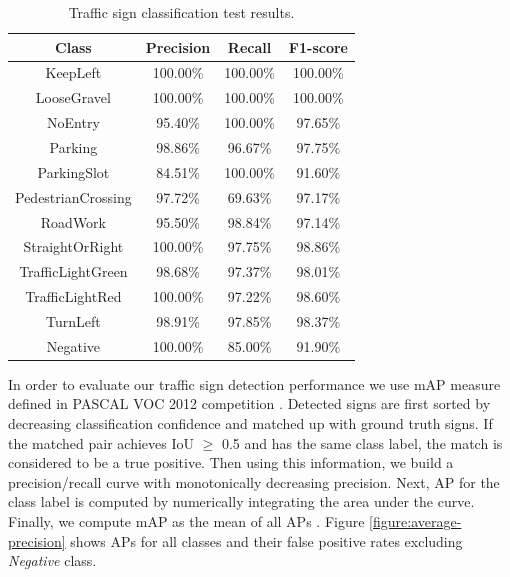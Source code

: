 \begin{table}[h]
  \begin{center}
    \caption[Traffic sign classification test results]{Traffic sign
      classification test results.}
    \label{table:classification-test-results}
    \begin{tabular}{|c|c|c|c|}
      \hline
      \textbf{Class}     & \textbf{Precision} & \textbf{Recall}  & \textbf{F1-score} \\
      \hline
      KeepLeft           & 100.00\%           & 100.00\%         & 100.00\% \\
      LooseGravel        & 100.00\%           & 100.00\%         & 100.00\% \\
      NoEntry            & 95.40\%            & 100.00\%         &  97.65\% \\
      Parking            & 98.86\%            & 96.67\%          &  97.75\% \\
      ParkingSlot        & 84.51\%            & 100.00\%         &  91.60\% \\
      PedestrianCrossing & 97.72\%            & 69.63\%          &  97.17\% \\
      RoadWork           & 95.50\%            & 98.84\%          &  97.14\% \\
      StraightOrRight    & 100.00\%           & 97.75\%          &  98.86\% \\
      TrafficLightGreen  & 98.68\%            & 97.37\%          &  98.01\% \\
      TrafficLightRed    & 100.00\%           & 97.22\%          &  98.60\% \\
      TurnLeft           & 98.91\%            & 97.85\%          &  98.37\% \\
      Negative           & 100.00\%           & 85.00\%          &  91.90\% \\
      \hline
    \end{tabular}
  \end{center}
\end{table}

In order to evaluate our traffic sign detection performance we use mAP measure
defined in PASCAL VOC 2012 competition \cite{Everingham2010ThePV}. Detected
signs are first sorted by decreasing classification confidence and matched up
with ground truth signs. If the matched pair achieves IoU $\ge$ 0.5 and has the
same class label, the match is considered to be a true positive. Then using
this information, we build a precision/recall curve with monotonically
decreasing precision. Next, AP for the class label is computed by numerically
integrating the area under the curve. Finally, we compute mAP as the mean of
all APs \cite{Cartucho2019MAP}. Figure \ref{figure:average-precision} shows APs
for all classes and their false positive rates excluding \textit{Negative}
class.

